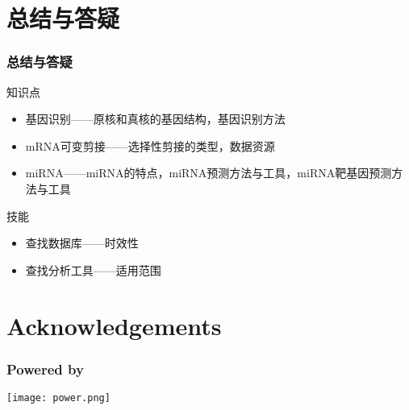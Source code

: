 \section{总结与答疑}
\begin{frame}
	\frametitle{总结与答疑}
	\begin{block}{知识点}
		\begin{itemize}
			\item 基因识别——原核和真核的基因结构，基因识别方法
			\item mRNA可变剪接——选择性剪接的类型，数据资源
			\item miRNA——miRNA的特点，miRNA预测方法与工具，miRNA靶基因预测方法与工具
		\end{itemize}
	\end{block}
	\begin{block}{技能}
		\begin{itemize}
			\item 查找数据库——时效性
			\item 查找分析工具——适用范围
		\end{itemize}
	\end{block}
\end{frame}

\section*{Acknowledgements}
\begin{frame}
	\frametitle{Powered by}
	\begin{center}
		\texttt{[image: power.png]}
	\end{center}
\end{frame}


